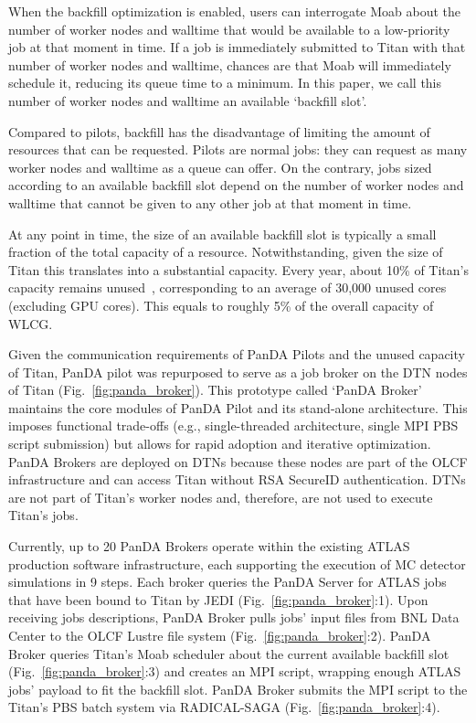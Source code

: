 When the backfill optimization is enabled, users can interrogate Moab about
the number of worker nodes and walltime that would be available to a
low-priority job at that moment in time. If a job is immediately submitted to
Titan with that number of worker nodes and walltime, chances are that Moab
will immediately schedule it, reducing its queue time to a minimum. In this
paper, we call this number of worker nodes and walltime an available
`backfill slot'.

Compared to pilots, backfill has the disadvantage of limiting the amount of
resources that can be requested. Pilots are normal jobs: they can request as
many worker nodes and walltime as a queue can offer. On the contrary, jobs
sized according to an available backfill slot depend on the number of worker
nodes and walltime that cannot be given to any other job at that moment in
time.

At any point in time, the size of an available backfill slot is typically a
small fraction of the total capacity of a resource. Notwithstanding, given
the size of Titan this translates into a substantial capacity. Every year,
about 10\% of Titan's capacity remains unused~\cite{barker2016us},
corresponding to an average of 30,000 unused cores (excluding GPU cores).
This equals to roughly 5\% of the overall capacity of WLCG\@.

Given the communication requirements of PanDA Pilots and the unused capacity
of Titan, PanDA pilot was repurposed to serve as a job broker on the DTN
nodes of Titan (Fig.~\ref{fig:panda_broker}). This prototype called `PanDA
Broker' maintains the core modules of PanDA Pilot and its stand-alone
architecture. This imposes functional trade-offs (e.g., single-threaded
architecture, single MPI PBS script submission) but allows for rapid adoption
and iterative optimization. PanDA Brokers are deployed on DTNs because these
nodes are part of the OLCF infrastructure and can access Titan without RSA
SecureID authentication. DTNs are not part of Titan's
worker nodes and, therefore, are not used to execute Titan's jobs.

Currently, up to 20 PanDA Brokers operate within the existing ATLAS
production software infrastructure, each supporting the execution of MC
detector simulations in 9 steps. Each broker queries the PanDA Server for
ATLAS jobs that have been bound to Titan by JEDI
(Fig.~\ref{fig:panda_broker}:1). Upon receiving jobs descriptions, PanDA
Broker pulls jobs' input files from BNL Data Center to the OLCF Lustre file
system (Fig.~\ref{fig:panda_broker}:2). PanDA Broker queries Titan's Moab
scheduler about the current available backfill slot
(Fig.~\ref{fig:panda_broker}:3) and creates an MPI script, wrapping enough
ATLAS jobs' payload to fit the backfill slot. PanDA Broker submits the MPI
script to the Titan's PBS batch system via RADICAL-SAGA
(Fig.~\ref{fig:panda_broker}:4).

